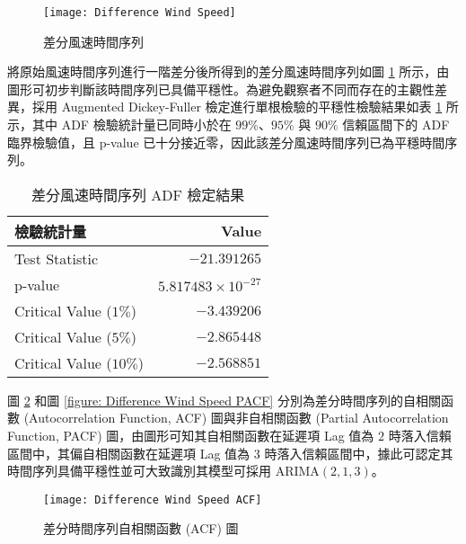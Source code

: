 \begin{figure}[htbp]
  \centering
  \texttt{[image: Difference Wind Speed]}
  \caption{差分風速時間序列}
  \label{figure: Difference Wind Speed}
\end{figure}

將原始風速時間序列進行一階差分後所得到的差分風速時間序列如圖 \ref{figure: Difference Wind Speed} 所示，由圖形可初步判斷該時間序列已具備平穩性。為避免觀察者不同而存在的主觀性差異，採用 Augmented Dickey-Fuller 檢定進行單根檢驗的平穩性檢驗結果如表 \ref{table: Difference Time Series ADF Result} 所示，其中 ADF 檢驗統計量已同時小於在 $99\%$、$95\%$ 與 $90\%$ 信賴區間下的 ADF 臨界檢驗值，且 p-value 已十分接近零，因此該差分風速時間序列已為平穩時間序列。

\begin{table}[htbp]
  \centering
  \caption[差分風速時間序列 ADF 檢定結果]{差分風速時間序列 ADF 檢定結果}
  \begin{tabular}{lr}
    \toprule
    \textbf{檢驗統計量}     & \textbf{Value}             \\
    \midrule
    Test Statistic          & $-21.391265$               \\
    p-value                 & $5.817483 \times 10^{-27}$ \\
    Critical Value ($1\%$)  & $-3.439206$                \\
    Critical Value ($5\%$)  & $-2.865448$                \\
    Critical Value ($10\%$) & $-2.568851$                \\
    \bottomrule
  \end{tabular}
  \label{table: Difference Time Series ADF Result}
\end{table}

圖 \ref{figure: Difference Wind Speed ACF} 和圖 \ref{figure: Difference Wind Speed PACF} 分別為差分時間序列的自相關函數 (Autocorrelation Function, ACF) 圖與非自相關函數 (Partial Autocorrelation Function, PACF) 圖，由圖形可知其自相關函數在延遲項 Lag 值為 $2$ 時落入信賴區間中，其偏自相關函數在延遲項 Lag 值為 $3$ 時落入信賴區間中，據此可認定其時間序列具備平穩性並可大致識別其模型可採用 $\text{ARIMA} (2, 1, 3)$。

\begin{figure}[htbp]
  \centering
  \texttt{[image: Difference Wind Speed ACF]}
  \caption{差分時間序列自相關函數 (ACF) 圖}
  \label{figure: Difference Wind Speed ACF}
\end{figure}

